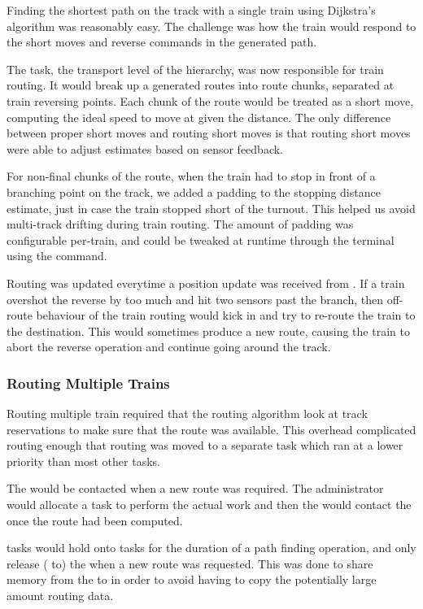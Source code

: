 \documentclass[pdftex,10pt,a4paper]{article}
\begin{document}
Finding the shortest path on the track with a single train using
Dijkstra's algorithm was reasonably easy. The challenge was how the
train would respond to the short moves and reverse commands in the
generated path.

The  task, the transport level of the hierarchy, was now
responsible for train routing. It would break up a generated routes
into route chunks, separated at train reversing points. Each chunk of
the route would be treated as a short move, computing the ideal speed
to move at given the distance. The only difference between proper
short moves and routing short moves is that routing short moves were
able to adjust estimates based on sensor feedback.

For non-final chunks of the route, when the train had to stop in front
of a branching point on the track, we added a padding to the stopping
distance estimate, just in case the train stopped short of the
turnout. This helped us avoid multi-track drifting during train
routing. The amount of padding was configurable per-train, and could
be tweaked at runtime through the terminal using the  command.

Routing was updated everytime a position update was received from
. If a train overshot the reverse by too much and hit two
sensors past the branch, then off-route behaviour of the train routing
would kick in and try to re-route the train to the destination. This
would sometimes produce a new route, causing the train to abort the
reverse operation and continue going around the track.

\subsubsection*{Routing Multiple Trains}

Routing multiple train required that the routing algorithm look at
track reservations to make sure that the route was available. This
overhead complicated routing enough that routing was moved to a
separate task which ran at a lower priority than most other tasks.

The  would be contacted when a new
route was required. The administrator would allocate a 
task to perform the actual work and then the  would
contact the  once the route had been computed.

 tasks would hold onto  tasks for the duration
of a path finding operation, and only release ( to) the
 when a new route was requested. This was done to share
memory from the  to  in order to avoid
having to copy the potentially large amount routing data.
\end{document}
